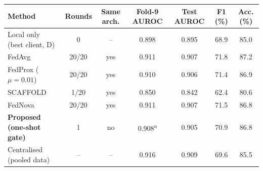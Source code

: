 \begin{tabular}{@{}lcccccc@{}}
\toprule
Method & Rounds & Same arch. & Fold-9 AUROC & Test AUROC & F1 (\%) & Acc. (\%) \\
\midrule
Local only (best client, D) & 0 & -- & 0.898 & 0.895 & 68.9 & 85.0 \\
FedAvg \cite{mcmahan2017fedavg} & 20/20 & yes & 0.911 & 0.907 & 71.8 & 87.2 \\
FedProx ($\mu=0.01$) \cite{li2020fedprox} & 20/20 & yes & 0.910 & 0.906 & 71.4 & 86.9 \\
SCAFFOLD \cite{karimireddy2020scaffold} & 1/20 & yes & 0.850 & 0.842 & 62.4 & 80.6 \\
FedNova \cite{wang2020fednova} & 20/20 & yes & 0.911 & 0.907 & 71.5 & 86.8 \\
\textbf{Proposed (one-shot gate)} & 1 & no & 0.908\textsuperscript{a} & 0.905 & 70.9 & 86.8 \\
\midrule
Centralised (pooled data) & -- & -- & 0.916 & 0.909 & 69.6 & 85.5 \\
\bottomrule
\end{tabular}
